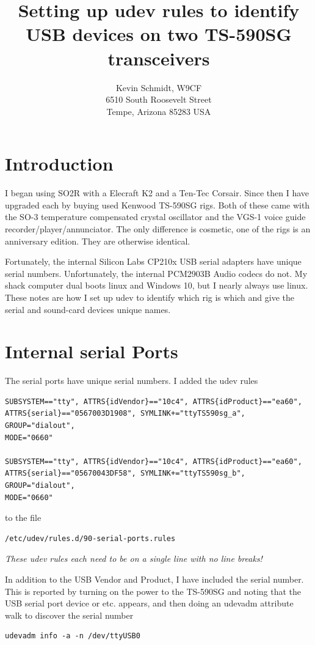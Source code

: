 \documentclass[12pt]{article}
\begin{document}
\title{
Setting up udev rules to identify USB devices on two TS-590SG transceivers
}
\author{
Kevin Schmidt, W9CF\\
6510 South Roosevelt Street\\
Tempe, Arizona 85283 USA\\
}
\date{}
\maketitle

\section{Introduction}
I began using SO2R with a Elecraft K2 and a Ten-Tec Corsair. Since then
I have upgraded each by buying used Kenwood TS-590SG rigs. Both of
these came with the SO-3 temperature compensated crystal oscillator
and the VGS-1 voice guide recorder/player/annunciator.
The only difference is cosmetic,
one of the rigs is an anniversary edition. They are otherwise identical.

Fortunately, the internal Silicon Labs CP210x USB serial adapters have
unique serial numbers. Unfortunately, the internal PCM2903B Audio codecs
do not. My shack computer dual boots linux and Windows 10, but I nearly
always use linux. These notes are how I set up udev to identify which
rig is which and give the serial and sound-card devices unique names.

\section{Internal serial Ports}
The serial ports have unique serial numbers. I added the udev rules
\begin{verbatim}
SUBSYSTEM=="tty", ATTRS{idVendor}=="10c4", ATTRS{idProduct}=="ea60",
ATTRS{serial}=="0567003D1908", SYMLINK+="ttyTS590sg_a", GROUP="dialout",
MODE="0660"

SUBSYSTEM=="tty", ATTRS{idVendor}=="10c4", ATTRS{idProduct}=="ea60",
ATTRS{serial}=="05670043DF58", SYMLINK+="ttyTS590sg_b", GROUP="dialout",
MODE="0660"
\end{verbatim}
to the file
\begin{verbatim}
/etc/udev/rules.d/90-serial-ports.rules
\end{verbatim}
{\em These udev rules each need to be on a single line with no line breaks!}

In addition to the USB Vendor and Product, I have included
the serial number. This is reported by turning on the power to the
TS-590SG and noting that the USB serial port device
 or  etc. appears, and then
doing an udevadm attribute walk to discover the serial number
\begin{verbatim}
udevadm info -a -n /dev/ttyUSB0
\end{verbatim}
\end{document}
